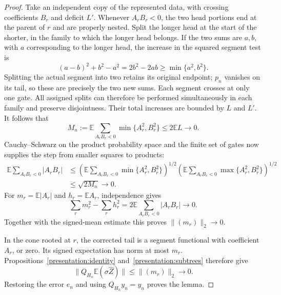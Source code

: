 \begin{proof}
Take an independent copy of the represented data, with crossing
coefficients $B_r$ and deficit $L'$.  Whenever $A_rB_r<0$, the two
head portions end at the parent of $r$ and are properly nested.
Split the longer head at the start of the shorter, in the family to
which the longer head belongs.  If the two sums are $a,b$, with $a$
corresponding to the longer head, the increase in the squared segment
test is
\[
 (a-b)^2+b^2-a^2=2b^2-2ab\ge\min\{a^2,b^2\}.
\]
Splitting the actual segment into two retains its original endpoint;
$p_n$ vanishes on its tail, so these are precisely the two new sums.
Each segment crosses at only one gate.  All assigned splits can
therefore be performed simultaneously in each family and preserve
disjointness.  Their total increases are bounded by $L$ and $L'$.
It follows that
\[
 M_n:=\mathbb E\sum_{A_rB_r<0}\min\{A_r^2,B_r^2\}
 \le2\mathbb EL\longrightarrow0.
\]
Cauchy--Schwarz on the product probability space and the finite set of
gates now supplies the step from smaller squares to products:
\[
 \begin{split}
 \mathbb E\sum_{A_rB_r<0}|A_rB_r|
 &\le\left(\mathbb E\sum_{A_rB_r<0}\min\{A_r^2,B_r^2\}\right)^{1/2}
       \left(\mathbb E\sum_{A_rB_r<0}\max\{A_r^2,B_r^2\}\right)^{1/2}\\
 &\le\sqrt{2M_n}\longrightarrow0.
 \end{split}
\]
For $m_r=\mathbb E|A_r|$ and $h_r=\mathbb EA_r$, independence gives
\[
 \sum_r m_r^2-\sum_r h_r^2
 =2\mathbb E\sum_{A_rB_r<0}|A_rB_r|\longrightarrow0.
\]
Together with the signed-mean estimate this proves $\|(m_r)\|_2\to0$.

In the cone rooted at $r$, the corrected tail is a segment functional
with coefficient $A_r$, or zero.  Its signed expectation has norm at
most $m_r$.  Propositions~\ref{presentation:identity} and~\ref{presentation:subtrees}
therefore give
\[
 \|Q_{H_n}\mathbb E(\sigma\widehat Z)\|\le\|(m_r)\|_2\longrightarrow0.
\]
Restoring the error $e_n$ and using $Q_{H_n}y_n=y_n$ proves the lemma.
\end{proof}

